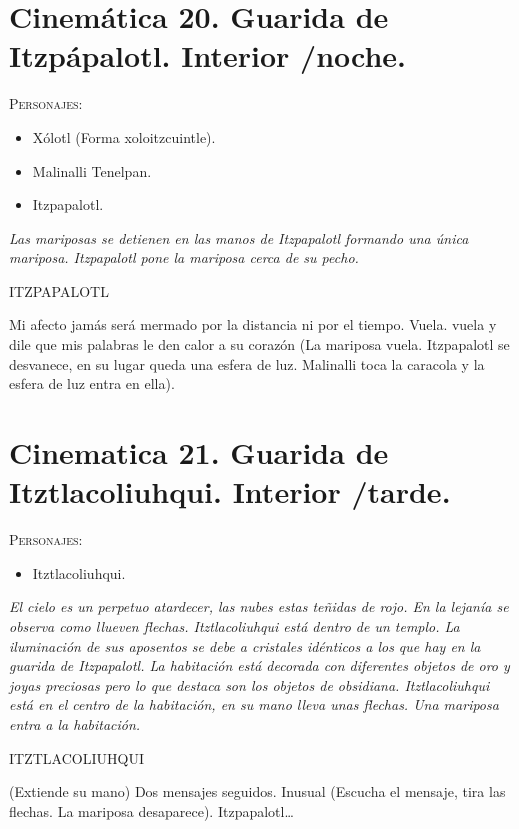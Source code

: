 \documentclass[11pt,letterpaper]{article}
\begin{document}
\section{Cinemática 20. Guarida de Itzpápalotl. Interior /noche.}
\textsc{Personajes}:
\begin{itemize}
\item Xólotl (Forma xoloitzcuintle).
\item Malinalli Tenelpan.
\item Itzpapalotl.
\end{itemize}
\textit{Las mariposas se detienen en las manos de Itzpapalotl formando una única mariposa. Itzpapalotl pone la mariposa cerca de su pecho.}
\begin{center}
ITZPAPALOTL
\\
\par
Mi afecto jamás será mermado por la distancia ni por el tiempo. Vuela. vuela y dile que mis palabras le den calor a su corazón (La mariposa vuela. Itzpapalotl se desvanece, en su lugar queda una esfera de luz. Malinalli toca la caracola y la esfera de luz entra en ella).
\end{center}

\section{Cinematica 21. Guarida de Itztlacoliuhqui. Interior /tarde.}
\textsc{Personajes}:
\begin{itemize}
\item Itztlacoliuhqui. 
\end{itemize}
\textit{El cielo es un perpetuo atardecer, las nubes estas teñidas de rojo. En la lejanía se observa como llueven flechas. Itztlacoliuhqui está dentro de un templo. La iluminación de sus aposentos se debe a cristales idénticos a los que hay en la guarida de Itzpapalotl. La habitación está decorada con diferentes objetos de oro y joyas preciosas pero lo que destaca son los objetos de obsidiana. Itztlacoliuhqui está en el centro de la habitación, en su mano lleva unas flechas. Una mariposa entra a la habitación.}
\begin{center}
ITZTLACOLIUHQUI
\\
\par
(Extiende su mano) Dos mensajes seguidos. Inusual (Escucha el mensaje, tira las flechas. La mariposa desaparece).  Itzpapalotl…
\end{center}
\end{document}

